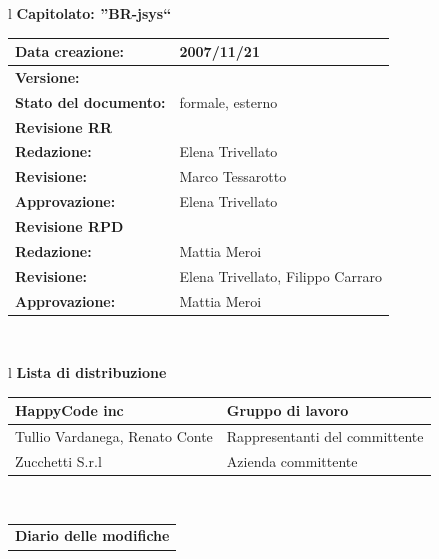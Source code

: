 \documentclass[11pt,titlepage,a4paper]{report}
\begin{document}
\begin{center}
\thispagestyle{plain}
\begin{table}[htbp]

\large{
\begin{tabular}{l}
\Large{\textbf{\textsf{Capitolato: ''BR-jsys``}}} \\
\begin{tabular}{||p{6cm}||p{6cm}||} \hline
\textbf{Data creazione:} & 2007/11/21 \\ \hline
\textbf{Versione:} & \lv \\ \hline
\textbf{Stato del documento:} & formale, esterno \\ \hline
\textbf{Revisione RR} &           \\ \hline
\textbf{Redazione:} & Elena Trivellato \\ \hline
\textbf{Revisione:} & Marco Tessarotto \\ \hline
\textbf{Approvazione:} & Elena Trivellato \\ \hline
\textbf{Revisione RPD} &    \\ \hline
\textbf{Redazione:} & Mattia Meroi \\ \hline
\textbf{Revisione:} & Elena Trivellato, Filippo Carraro \\ \hline
\textbf{Approvazione:}  & Mattia Meroi \\  \hline
\end{tabular} \\
\end{tabular}
}
\end{table}

\begin{table}[hbtp]
\large{
\begin{tabular}{l}
\Large{\textbf{\textsf{Lista di distribuzione}}} \\
\begin{tabular}{||p{6cm}||p{6cm}||} \hline
{HappyCode inc}& Gruppo di lavoro\\ \hline
{Tullio Vardanega, Renato Conte}& Rappresentanti del committente \\ \hline 
{Zucchetti S.r.l}& Azienda committente\\ \hline
\end{tabular} \\
\end{tabular}
}
\end{table}
\begin{table}[hbtp]
\large{
\begin{tabular}{l}
\Large{\textbf{\textsf{Diario delle modifiche}}} \\


\end{tabular}}
\end{table}
\end{center}
\end{document}
